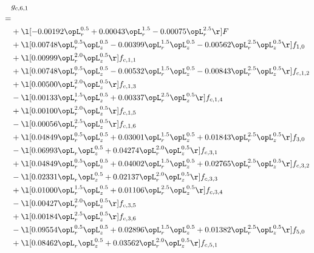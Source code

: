 \begin{alignat}{2} 
\label{eq:g_61_0} 
& g_{c,6,1} \nonumber \\ 
 = \\ 
& + \l[  -0.00192 \opL_r^{0.5} +  0.00043 \opL_r^{1.5}   -0.00075 \opL_r^{2.5}  \r] F \nonumber \\ 
& + \l[  0.00748 \opL_r^{0.5} \opL_z^{0.5}   -0.00399 \opL_r^{1.5} \opL_z^{0.5}   -0.00562 \opL_r^{2.5} \opL_z^{0.5}  \r] f_{1,0} \nonumber \\ 
& + \l[  0.00999 \opL_r^{2.0} \opL_z^{0.5}  \r] f_{c,1,1} \nonumber \\ 
& + \l[  0.00748 \opL_r^{0.5} \opL_z^{0.5}   -0.00532 \opL_r^{1.5} \opL_z^{0.5}   -0.00843 \opL_r^{2.5} \opL_z^{0.5}  \r] f_{c,1,2} \nonumber \\ 
& + \l[  0.00500 \opL_r^{2.0} \opL_z^{0.5}  \r] f_{c,1,3} \nonumber \\ 
& - \l[  0.00133 \opL_r^{1.5} \opL_z^{0.5} +  0.00337 \opL_r^{2.5} \opL_z^{0.5}  \r] f_{c,1,4} \nonumber \\ 
& + \l[  0.00100 \opL_r^{2.0} \opL_z^{0.5}  \r] f_{c,1,5} \nonumber \\ 
& - \l[  0.00056 \opL_r^{2.5} \opL_z^{0.5}  \r] f_{c,1,6} \nonumber \\ 
& + \l[  0.04849 \opL_r^{0.5} \opL_z^{0.5} +  0.03001 \opL_r^{1.5} \opL_z^{0.5} +  0.01843 \opL_r^{2.5} \opL_z^{0.5}  \r] f_{3,0} \nonumber \\ 
& - \l[  0.06993 \opL_r \opL_z^{0.5} +  0.04274 \opL_r^{2.0} \opL_z^{0.5}  \r] f_{c,3,1} \nonumber \\ 
& + \l[  0.04849 \opL_r^{0.5} \opL_z^{0.5} +  0.04002 \opL_r^{1.5} \opL_z^{0.5} +  0.02765 \opL_r^{2.5} \opL_z^{0.5}  \r] f_{c,3,2} \nonumber \\ 
& - \l[  0.02331 \opL_r \opL_z^{0.5} +  0.02137 \opL_r^{2.0} \opL_z^{0.5}  \r] f_{c,3,3} \nonumber \\ 
& + \l[  0.01000 \opL_r^{1.5} \opL_z^{0.5} +  0.01106 \opL_r^{2.5} \opL_z^{0.5}  \r] f_{c,3,4} \nonumber \\ 
& - \l[  0.00427 \opL_r^{2.0} \opL_z^{0.5}  \r] f_{c,3,5} \nonumber \\ 
& + \l[  0.00184 \opL_r^{2.5} \opL_z^{0.5}  \r] f_{c,3,6} \nonumber \\ 
& - \l[  0.09554 \opL_r^{0.5} \opL_z^{0.5} +  0.02896 \opL_r^{1.5} \opL_z^{0.5} +  0.01382 \opL_r^{2.5} \opL_z^{0.5}  \r] f_{5,0} \nonumber \\ 
& + \l[  0.08462 \opL_r \opL_z^{0.5} +  0.03562 \opL_r^{2.0} \opL_z^{0.5}  \r] f_{c,5,1} \nonumber \\ 

\end{alignat}
